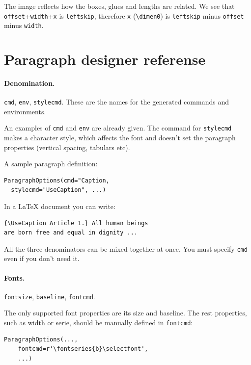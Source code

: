 \documentclass[]{ltugboat}
\begin{document}
The image reflects how the boxes, glues and lengths are related. We see that \verb|offset|+\verb|width|+\verb|x| is \verb|leftskip|, therefore \verb|x| (\verb|\dimen0|) is \verb|leftskip| minus \verb|offset| minus \verb|width|.


\section{Paragraph designer referense}

\paragraph{Denomination.} \verb|cmd|, \verb|env|, \verb|stylecmd|. These are the names for the generated commands and environments.

An examples of \verb|cmd| and \verb|env| are already given. The command for \verb|stylecmd| makes a character style, which affects the font and doesn't set the paragraph properties (vertical spacing, tabulars etc).

A sample paragraph definition:

\begin{verbatim}
ParagraphOptions(cmd="Caption,
  stylecmd="UseCaption", ...)
\end{verbatim}

In a \LaTeX{} document you can write:

\begin{verbatim}
{\UseCaption Article 1.} All human beings
are born free and equal in dignity ...
\end{verbatim}

All the three denominators can be mixed together at once. You must specify \verb|cmd| even if you don't need it.

\paragraph{Fonts.} \verb|fontsize|, \verb|baseline|, \verb|fontcmd|.

The only supported font properties are its size and baseline. The rest properties, such as width or serie, should be manually defined in \verb|fontcmd|:

\begin{verbatim}
ParagraphOptions(...,
    fontcmd=r'\fontseries{b}\selectfont',
    ...)
\end{verbatim}
\end{document}
